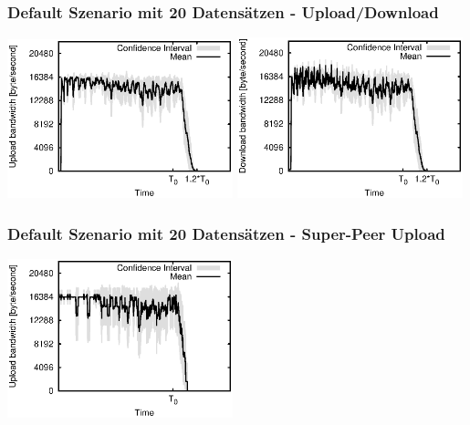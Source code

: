 \begin{frame}
  \frametitle{Default Szenario mit 20 Datensätzen - Upload/Download}
  \begin{center}
    \includegraphics[width=0.49\textwidth]{fig/plots/scenario_6_parts_20/plots/GeneratedMeanCurrentUploadBandwidth.csv.eps}
    \includegraphics[width=0.49\textwidth]{fig/plots/scenario_6_parts_20/plots/GeneratedMeanCurrentDownloadBandwidth.csv.eps}
  \end{center}
\end{frame}


\begin{frame}
  \frametitle{Default Szenario mit 20 Datensätzen - Super-Peer Upload}
  \begin{center}
    \includegraphics[width=0.49\textwidth]{fig/plots/scenario_6_parts_20/plots/GeneratedMeanCurrentSuperSeederUploadBandwidth.csv.eps}
  \end{center}
\end{frame}



